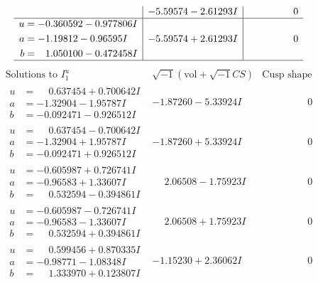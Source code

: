 \documentclass[1p]{elsarticle_modified}
\theoremstyle{definition}
\newcommand{\I}{\sqrt{-1}}
\begin{document}
$$\begin{array}{c|c|c}
 & -5.59574 - 2.61293 I & \phantom{-0.000000 } 0 \\ \hline\begin{aligned}
u &= -0.360592 - 0.977806 I \\
a &= -1.19812 - 0.96595 I \\
b &= \phantom{-}1.050100 - 0.472458 I\end{aligned}
 & -5.59574 + 2.61293 I & \phantom{-0.000000 } 0\\
 \hline 
 \end{array}$$\newpage$$\begin{array}{c|c|c}  
\text{Solutions to }I^u_{1}& \I (\text{vol} + \sqrt{-1}CS) & \text{Cusp shape}\\
 \hline 
\begin{aligned}
u &= \phantom{-}0.637454 + 0.700642 I \\
a &= -1.32904 - 1.95787 I \\
b &= -0.092471 - 0.926512 I\end{aligned}
 & -1.87260 - 5.33924 I & \phantom{-0.000000 } 0 \\ \hline\begin{aligned}
u &= \phantom{-}0.637454 - 0.700642 I \\
a &= -1.32904 + 1.95787 I \\
b &= -0.092471 + 0.926512 I\end{aligned}
 & -1.87260 + 5.33924 I & \phantom{-0.000000 } 0 \\ \hline\begin{aligned}
u &= -0.605987 + 0.726741 I \\
a &= -0.96583 + 1.33607 I \\
b &= \phantom{-}0.532594 - 0.394861 I\end{aligned}
 & \phantom{-}2.06508 - 1.75923 I & \phantom{-0.000000 } 0 \\ \hline\begin{aligned}
u &= -0.605987 - 0.726741 I \\
a &= -0.96583 - 1.33607 I \\
b &= \phantom{-}0.532594 + 0.394861 I\end{aligned}
 & \phantom{-}2.06508 + 1.75923 I & \phantom{-0.000000 } 0 \\ \hline\begin{aligned}
u &= \phantom{-}0.599456 + 0.870335 I \\
a &= -0.98771 - 1.08348 I \\
b &= \phantom{-}1.333970 + 0.123807 I\end{aligned}
 & -1.15230 + 2.36062 I & \phantom{-0.000000 } 0 \\ \hline\begin{aligned}

\end{aligned}
\end{array}$$
\end{document}
